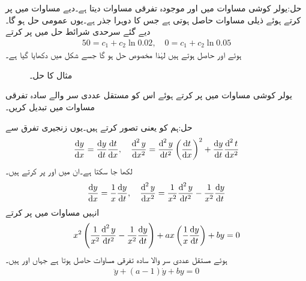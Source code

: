 حل:یولر کوشی مساوات میں  اور  موجودہ تفرقی مساوات دیتا ہے۔دیے مساوات میں  پر کرتے ہوئے ذیلی مساوات  حاصل ہوتی ہے جس کا دوہرا جذر  ہے۔یوں عمومی  حل  ہو گا۔دیے گئے سرحدی شرائط حل میں پر کرتے 
\begin{align*}
50=c_1+c_2\ln 0.02, \quad 0=c_1+c_2\ln 0.05
\end{align*}
ہوئے  اور  حاصل ہوتے ہیں لہٰذا مخصوص حل  ہو گا جسے شکل  میں دکھایا گیا ہے۔
\begin{figure}
\centering
{}
\caption{مثال  کا حل۔}
\label{شکل_مثال_سادہ_دو_ہم_محوری_نلکی_میدان}
\end{figure}
یولر کوشی مساوات  میں  پر کرتے ہوئے اس کو مستقل عددی سر والے سادہ تفرقی مساوات میں تبدیل کریں۔

حل:ہم  کو  یعنی  تصور کرتے ہیں۔یوں زنجیری تفرق سے
\begin{align*}
\frac{\dif y}{\dif x}=\frac{\dif y}{\dif t}\frac{\dif t}{\dif x}, \quad \frac{\dif^{\,2} y}{\dif x^2}=\frac{\dif^{\,2}y}{\dif t^2}\left(\frac{\dif t}{\dif x}\right)^2+\frac{\dif y}{\dif t}\frac{\dif^{\,2} t}{\dif x^2}
\end{align*}
لکھا جا سکتا ہے۔ان میں  اور  پر کرتے ہیں۔
\begin{align*}
\frac{\dif y}{\dif x}=\frac{1}{x}\frac{\dif y}{\dif t}, \quad \frac{\dif^{\,2} y}{\dif x^2}=\frac{1}{x^2}\frac{\dif^{\,2}y}{\dif t^2}-\frac{1}{x^2}\frac{\dif y}{\dif t}
\end{align*}
انہیں مساوات  میں پر کرتے 
\begin{align*}
x^2\left(\frac{1}{x^2}\frac{\dif^{\,2}y}{\dif t^2}-\frac{1}{x^2}\frac{\dif y}{\dif t}\right)+ax\left(\frac{1}{x}\frac{\dif y}{\dif t}\right)+by=0
\end{align*}
ہوئے مستقل عددی سر والا سادہ تفرقی مساوات حاصل ہوتا ہے  جہاں  اور  ہیں۔
\begin{align}
\ddot{y}+(a-1)\dot{y}+by=0
\end{align}

